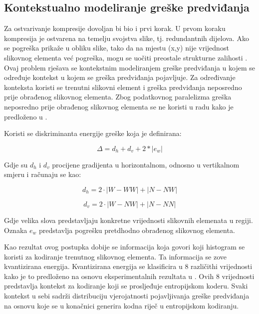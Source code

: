 \documentclass[times, utf8, zavrsni, numeric, sort]{fer}
\begin{document}
\subsection{Kontekstualno modeliranje greške predviđanja}
Za ostvarivanje kompresije dovoljan bi bio i prvi korak. U prvom koraku kompresija je ostvarena na temelju svojstva slike, tj. redundantnih dijelova. Ako se pogreška prikaže u obliku slike, tako da na mjestu (x,y) nije vrijednost slikovnog elementa već pogreška, mogu se uočiti preostale strukturne zalihosti \cite{Knezovic:007}. Ovaj problem rješava se kontekstnim modeliranjem greške predviđanja u kojem se određuje kontekst u kojem se greška predviđanja pojavljuje. Za određivanje konteksta koristi se trenutni slikovni element i greška predviđanja neposredno prije obrađenog slikovnog elementa. Zbog podatkovnog paralelizma greška neposredno prije obrađenog slikovnog elementa se ne koristi u radu kako je predloženo u \cite{Knezovic:06}.


Koristi se diskriminanta energije greške \cite{Wu:97} koja je definirana:

\begin{equation}
\Delta = d_{h} + d_{v} + 2*|e_{w}|
\end{equation}

Gdje su $d_{h}$ i $d_{v}$ procijene gradijenta u horizontalnom, odnosno u vertikalnom smjeru i računaju se kao:	

\begin{equation}
d_{h}=2 \cdot |W-WW| + |N-NW|
\end{equation}

\begin{equation}
d_{v}=2 \cdot |W-NW| + |N-NN|
\end{equation}

Gdje velika slova predstavljaju konkretne vrijednosti slikovnih elemenata u regiji. Oznaka $e_{w}$ predstavlja pogrešku pretdhodno obrađenog slikovnog elementa.

\begin{comment}
Ovakav pristup je idealan za implementaciju u tokovnom programskom modelu, ali prilikom prilagodbe za grafičke kartice ovaj parametar je izostavljen, što ne utječe na ispravnost algoritma zbog toga što je sam postupak procjena (heuristika).
\end{comment}

Kao rezultat ovog postupka dobije se informacija koja govori koji histogram se koristi za kodiranje trenutnog slikovnog elementa. Ta informacija se zove kvantizirana energija. Kvantizirana energija se klasificira u 8 različithi vrijednosti kako je to predloženo na osnovu eksperimentalnih rezultata u \cite{Wu:97}. Ovih 8 vrijednosti predstavlja kontekst za kodiranje koji se prosljeđuje entropijskom koderu. Svaki kontekst u sebi sadrži distribuciju vjerojatnosti pojavljivanja greške predviđanja na osnovu koje se u konačnici generira kodna riječ u entropijskom kodiranju.
\end{document}
